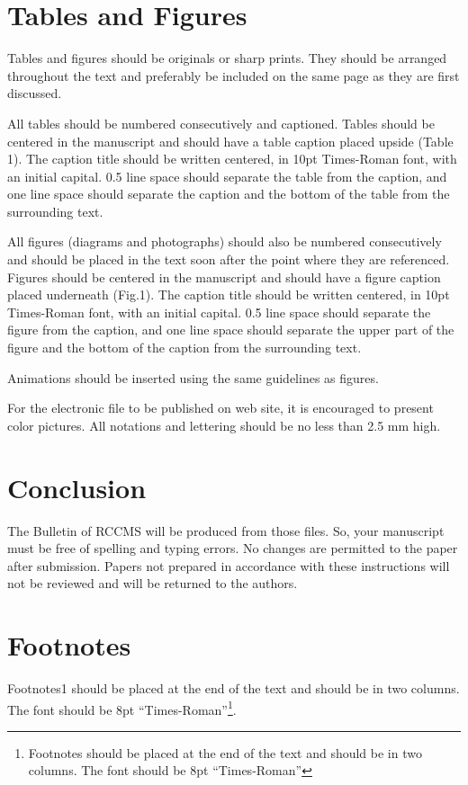 \documentclass[english]{brccms-hu}
\begin{document}
\section{Tables and Figures}
Tables and figures should be originals or sharp 
prints. They should be arranged throughout the text 
and preferably be included on the same page as they 
are first discussed.

All tables should be numbered consecutively and 
captioned. Tables should be centered in the manuscript 
and should have a table caption placed upside (Table 
1). The caption title should be written centered, in 10pt 
Times-Roman font, with an initial capital. 0.5 line 
space should separate the table from the caption, and 
one line space should separate the caption and the 
bottom of the table from the surrounding text.

All figures (diagrams and photographs) should also 
be numbered consecutively and should be placed in the 
text soon after the point where they are referenced. 
Figures should be centered in the manuscript and 
should have a figure caption placed underneath (Fig.1). 
The caption title should be written centered, in 10pt 
Times-Roman font, with an initial capital. 0.5 line 
space should separate the figure from the caption, and 
one line space should separate the upper part of the 
figure and the bottom of the caption from the 
surrounding text.

Animations should be inserted using the same 
guidelines as figures.

For the electronic file to be published on web site, 
it is encouraged to present color pictures. All notations 
and lettering should be no less than 2.5 mm high.
\section{Conclusion}
The Bulletin of RCCMS will be produced from 
those files. So, your manuscript must be free of 
spelling and typing errors. No changes are permitted 
to the paper after submission. Papers not prepared in 
accordance with these instructions will not be 
reviewed and will be returned to the authors.
\section{Footnotes}
Footnotes1 should be placed at the end of the text 
and should be in two columns. The font should be 8pt
“Times-Roman”\footnote{Footnotes should be placed at the end of the text and should 
be in two columns. The font should be 8pt “Times-Roman”}.
\end{document}
